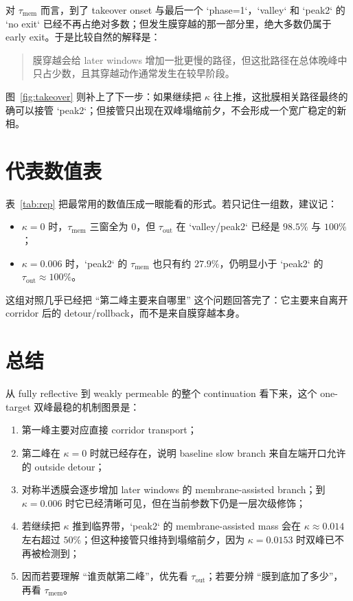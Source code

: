 \documentclass[11pt,fontset=fandol]{ctexart}
\begin{document}
对 \(\tau_{\mathrm{mem}}\) 而言，到了 takeover onset 与最后一个 `phase=1`，`valley` 和 `peak2` 的 `no exit` 已经不再占绝对多数；但发生膜穿越的那一部分里，绝大多数仍属于 early exit。于是比较自然的解释是：
\begin{quote}
膜穿越会给 later windows 增加一批更慢的路径，但这批路径在总体晚峰中只占少数，且其穿越动作通常发生在较早阶段。
\end{quote}
图~\ref{fig:takeover} 则补上了下一步：如果继续把 \(\kappa\) 往上推，这批膜相关路径最终的确可以接管 `peak2`；但接管只出现在双峰塌缩前夕，不会形成一个宽广稳定的新相。

\section{代表数值表}
\begin{table}[!htbp]
  \centering
  \footnotesize
  
  \caption{代表性 \(\kappa\) 下两个 observable 的窗口条件 exit probability 与 `peak2` relative timing ratio。}
  \label{tab:rep}
\end{table}

表~\ref{tab:rep} 把最常用的数值压成一眼能看的形式。若只记住一组数，建议记：
\begin{itemize}
  \item \(\kappa=0\) 时，\(\tau_{\mathrm{mem}}\) 三窗全为 \(0\)，但 \(\tau_{\mathrm{out}}\) 在 `valley/peak2` 已经是 \(98.5\%\) 与 \(100\%\)；
  \item \(\kappa=0.006\) 时，`peak2` 的 \(\tau_{\mathrm{mem}}\) 也只有约 \(27.9\%\)，仍明显小于 `peak2` 的 \(\tau_{\mathrm{out}}\approx 100\%\)。
\end{itemize}
这组对照几乎已经把 ``第二峰主要来自哪里'' 这个问题回答完了：它主要来自离开 corridor 后的 detour/rollback，而不是来自膜穿越本身。

\section*{总结}
从 fully reflective 到 weakly permeable 的整个 continuation 看下来，这个 one-target 双峰最稳的机制图景是：
\begin{enumerate}
  \item 第一峰主要对应直接 corridor transport；
  \item 第二峰在 \(\kappa=0\) 时就已经存在，说明 baseline slow branch 来自左端开口允许的 outside detour；
  \item 对称半透膜会逐步增加 later windows 的 membrane-assisted branch；到 \(\kappa=0.006\) 时它已经清晰可见，但在当前参数下仍是一层次级修饰；
  \item 若继续把 \(\kappa\) 推到临界带，`peak2` 的 membrane-assisted mass 会在 \(\kappa\approx 0.014\) 左右超过 \(50\%\)；但这种接管只维持到塌缩前夕，因为 \(\kappa=0.0153\) 时双峰已不再被检测到；
  \item 因而若要理解 ``谁贡献第二峰''，优先看 \(\tau_{\mathrm{out}}\)；若要分辨 ``膜到底加了多少''，再看 \(\tau_{\mathrm{mem}}\)。
\end{enumerate}
\end{document}
